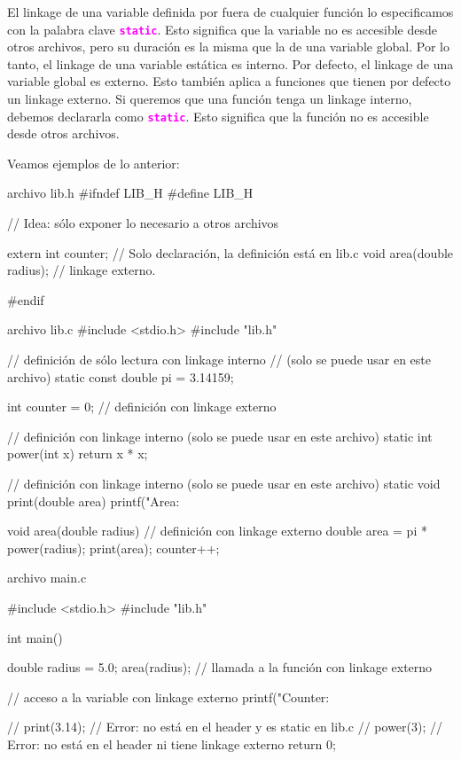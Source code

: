 \documentclass[]{scrartcl}
\newcommand{\hl}[1]{\textcolor{magenta}{\textbf{\texttt{#1}}}}
\begin{document}
\newpage
El linkage de una variable definida por fuera de cualquier función lo especificamos con la palabra clave \hl{static}. Esto significa que la variable no es accesible desde otros archivos, pero su duración es la misma que la de una variable global. Por lo tanto, el linkage de una variable estática es interno. Por defecto, el linkage de una variable global es externo.
Esto también aplica a funciones que tienen por defecto un linkage externo. Si queremos que una función tenga un linkage interno, debemos declararla como \hl{static}. Esto significa que la función no es accesible desde otros archivos.

Veamos ejemplos de lo anterior:

\begin{cbox}[]{archivo lib.h} 
  #ifndef LIB_H
  #define LIB_H
  
  // Idea: sólo exponer lo necesario a otros archivos

  extern int counter;        // Solo declaración, la definición está en lib.c
  void area(double radius);  // linkage externo. 
  
  #endif
\end{cbox}


\begin{cbox}[]{archivo lib.c}
  #include <stdio.h>
  #include "lib.h"

  // definición  de sólo lectura con linkage interno
  // (solo se puede usar en este archivo)
  static const double pi = 3.14159; 

  int counter = 0; // definición con linkage externo
  
  // definición con linkage interno (solo se puede usar en este archivo)
  static int power(int x) { 
      return x * x;
  }

  // definición con linkage interno (solo se puede usar en este archivo)
  static void print(double area){  
    printf("Area: %
  }
  
  void area(double radius) { // definición con linkage externo 
      double area = pi * power(radius);
      print(area);
      counter++;
  }
\end{cbox}

\begin{cbox}[]{archivo main.c}
  
  #include <stdio.h>
  #include "lib.h"

  int main() {
      double radius = 5.0;
      area(radius); // llamada a la función con linkage externo

      // acceso a la variable con linkage externo
      printf("Counter: %

      // print(3.14); // Error: no está en el header y es static en lib.c
      // power(3);    // Error: no está en el header ni tiene linkage externo
      return 0;
  }
\end{cbox}
\end{document}
